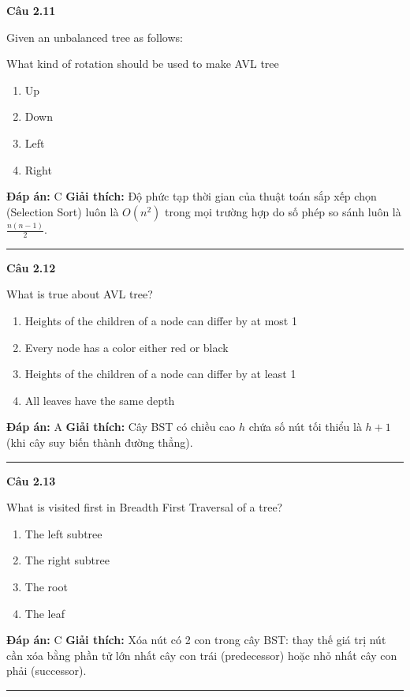 \documentclass[11pt,a4paper]{article}
\newenvironment{question}[1]{%
  \par\vspace{1em}\noindent\textbf{\large Câu #1}\par\vspace{0.4em}
}{%
  \par\vspace{1em}\hrule\vspace{0.6em}
}
\newenvironment{choices}{%
  \begin{enumerate}[label=\textbf{\Alph*.},leftmargin=2.2em,itemsep=2pt,topsep=3pt]
}{%
  \end{enumerate}
}
\newcommand{\choice}{\item}
\begin{document}
\begin{question}{2.11}
Given an unbalanced tree as follows:
\begin{center}
\end{center}
What kind of rotation should be used to make AVL tree
\begin{choices}
\choice Up
\choice Down
\choice Left
\choice Right
\end{choices}
\textbf{Đáp án:} C
\textbf{Giải thích:} Độ phức tạp thời gian của thuật toán sắp xếp chọn (Selection Sort) luôn là $O(n^2)$ trong mọi trường hợp do số phép so sánh luôn là $\frac{n(n-1)}{2}$.
\end{question}

\begin{question}{2.12}
What is true about AVL tree?
\begin{choices}
\choice Heights of the children of a node can differ by at most 1
\choice Every node has a color either red or black
\choice Heights of the children of a node can differ by at least 1
\choice All leaves have the same depth
\end{choices}
\textbf{Đáp án:} A
\textbf{Giải thích:} Cây BST có chiều cao $h$ chứa số nút tối thiểu là $h + 1$ (khi cây suy biến thành đường thẳng).
\end{question}

\begin{question}{2.13}
What is visited first in Breadth First Traversal of a tree?
\begin{choices}
\choice The left subtree
\choice The right subtree
\choice The root
\choice The leaf
\end{choices}
\textbf{Đáp án:} C
\textbf{Giải thích:} Xóa nút có 2 con trong cây BST: thay thế giá trị nút cần xóa bằng phần tử lớn nhất cây con trái (predecessor) hoặc nhỏ nhất cây con phải (successor).
\end{question}
\end{document}
